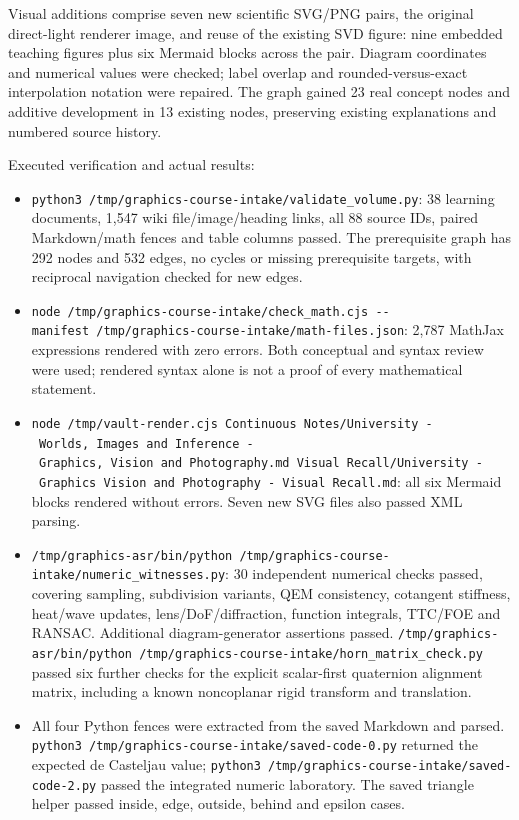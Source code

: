 Visual additions comprise seven new scientific SVG/PNG pairs, the original direct-light renderer image, and reuse of the existing SVD figure: nine embedded teaching figures plus six Mermaid blocks across the pair. Diagram coordinates and numerical values were checked; label overlap and rounded-versus-exact interpolation notation were repaired. The graph gained 23 real concept nodes and additive development in 13 existing nodes, preserving existing explanations and numbered source history.

Executed verification and actual results:

\begin{itemize}
\tightlist
\item
  \texttt{python3\ /tmp/graphics-course-intake/validate\_volume.py}: 38 learning documents, 1,547 wiki file/image/heading links, all 88 source IDs, paired Markdown/math fences and table columns passed. The prerequisite graph has 292 nodes and 532 edges, no cycles or missing prerequisite targets, with reciprocal navigation checked for new edges.
\item
  \texttt{node\ /tmp/graphics-course-intake/check\_math.cjs\ -\/-manifest\ /tmp/graphics-course-intake/math-files.json}: 2,787 MathJax expressions rendered with zero errors. Both conceptual and syntax review were used; rendered syntax alone is not a proof of every mathematical statement.
\item
  \texttt{node\ /tmp/vault-render.cjs\ \textquotesingle{}Continuous\ Notes/University\ -\ Worlds,\ Images\ and\ Inference\ -\ Graphics,\ Vision\ and\ Photography.md\textquotesingle{}\ \textquotesingle{}Visual\ Recall/University\ -\ Graphics\ Vision\ and\ Photography\ -\ Visual\ Recall.md\textquotesingle{}}: all six Mermaid blocks rendered without errors. Seven new SVG files also passed XML parsing.
\item
  \texttt{/tmp/graphics-asr/bin/python\ /tmp/graphics-course-intake/numeric\_witnesses.py}: 30 independent numerical checks passed, covering sampling, subdivision variants, QEM consistency, cotangent stiffness, heat/wave updates, lens/DoF/diffraction, function integrals, TTC/FOE and RANSAC. Additional diagram-generator assertions passed. \texttt{/tmp/graphics-asr/bin/python\ /tmp/graphics-course-intake/horn\_matrix\_check.py} passed six further checks for the explicit scalar-first quaternion alignment matrix, including a known noncoplanar rigid transform and translation.
\item
  All four Python fences were extracted from the saved Markdown and parsed. \texttt{python3\ /tmp/graphics-course-intake/saved-code-0.py} returned the expected de Casteljau value; \texttt{python3\ /tmp/graphics-course-intake/saved-code-2.py} passed the integrated numeric laboratory. The saved triangle helper passed inside, edge, outside, behind and epsilon cases.

\end{itemize}
